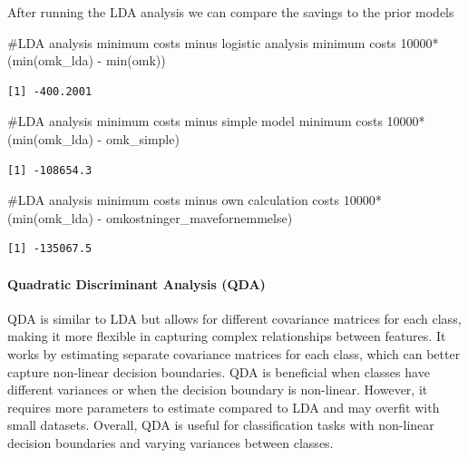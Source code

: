 \documentclass[
  letterpaper,
  DIV=11,
  numbers=noendperiod]{scrartcl}
\let\oldparagraph\paragraph
\renewcommand{\paragraph}[1]{\oldparagraph{#1}\mbox{}}
\newenvironment{Shaded}{\begin{snugshade}}{\end{snugshade}}
\newcommand{\CommentTok}[1]{\textcolor[rgb]{0.37,0.37,0.37}{#1}}
\newcommand{\DecValTok}[1]{\textcolor[rgb]{0.68,0.00,0.00}{#1}}
\newcommand{\FunctionTok}[1]{\textcolor[rgb]{0.28,0.35,0.67}{#1}}
\newcommand{\NormalTok}[1]{\textcolor[rgb]{0.00,0.23,0.31}{#1}}
\newcommand{\SpecialCharTok}[1]{\textcolor[rgb]{0.37,0.37,0.37}{#1}}
\begin{document}
After running the LDA analysis we can compare the savings to the prior
models

\begin{Shaded}
\begin{Highlighting}[]
\CommentTok{\#LDA analysis minimum costs minus logistic analysis minimum costs }
\DecValTok{10000}\SpecialCharTok{*}\NormalTok{(}\FunctionTok{min}\NormalTok{(omk\_lda) }\SpecialCharTok{{-}} \FunctionTok{min}\NormalTok{(omk)) }
\end{Highlighting}
\end{Shaded}

\begin{verbatim}
[1] -400.2001
\end{verbatim}

\begin{Shaded}
\begin{Highlighting}[]
\CommentTok{\#LDA analysis minimum costs minus simple model minimum costs }
\DecValTok{10000}\SpecialCharTok{*}\NormalTok{(}\FunctionTok{min}\NormalTok{(omk\_lda) }\SpecialCharTok{{-}}\NormalTok{ omk\_simple)}
\end{Highlighting}
\end{Shaded}

\begin{verbatim}
[1] -108654.3
\end{verbatim}

\begin{Shaded}
\begin{Highlighting}[]
\CommentTok{\#LDA analysis minimum costs minus own calculation costs}
\DecValTok{10000}\SpecialCharTok{*}\NormalTok{(}\FunctionTok{min}\NormalTok{(omk\_lda) }\SpecialCharTok{{-}}\NormalTok{ omkostninger\_mavefornemmelse)}
\end{Highlighting}
\end{Shaded}

\begin{verbatim}
[1] -135067.5
\end{verbatim}

\paragraph{Quadratic Discriminant Analysis
(QDA)}\label{quadratic-discriminant-analysis-qda}

QDA is similar to LDA but allows for different covariance matrices for
each class, making it more flexible in capturing complex relationships
between features. It works by estimating separate covariance matrices
for each class, which can better capture non-linear decision boundaries.
QDA is beneficial when classes have different variances or when the
decision boundary is non-linear. However, it requires more parameters to
estimate compared to LDA and may overfit with small datasets. Overall,
QDA is useful for classification tasks with non-linear decision
boundaries and varying variances between classes.
\end{document}
